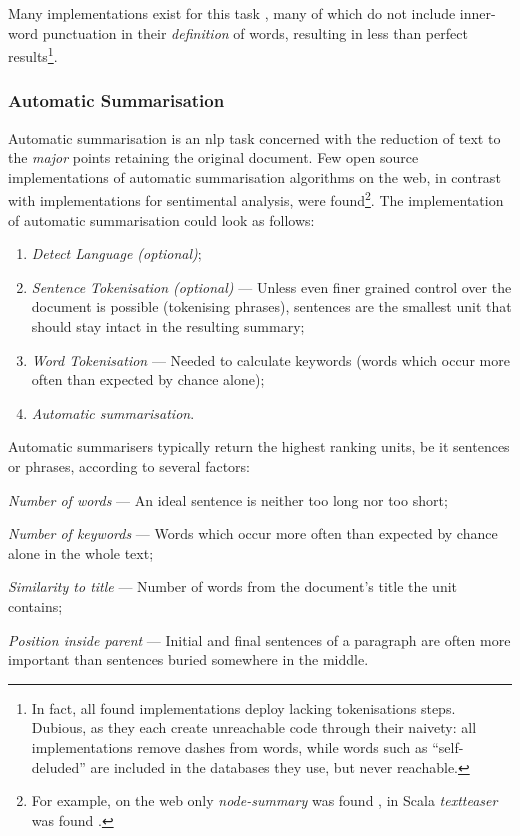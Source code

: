 Many implementations exist for this task
  \autocites{thinkroth/sentimental-source-code}{mileszim/sediment-source-code}
  {thisandagain/sentiment-source-code}, many of which do not include
  inner-word punctuation in their \emph{definition} of words, resulting in
  less than perfect results\footnote{In fact, all found implementations
      deploy lacking tokenisations steps.
    Dubious, as they each create unreachable code through their naivety:
      all implementations remove dashes from words, while words such as
      ``self-deluded'' are included in the databases they use, but never
      reachable.}.

\subsubsection{Automatic Summarisation}\label{automatic-summarisation}

Automatic summarisation is an \gls{nlp} task concerned with the reduction
  of text to the \emph{major} points retaining the original document.
Few open source implementations of automatic summarisation algorithms on
  the web, in contrast with implementations for sentimental analysis, were
  found\footnote{For example, on the web only \emph{node-summary} was found
    \autocite{jbrooksuk/node-summary-source-code}, in Scala \emph{textteaser}
    was found \autocite{MojoJolo/textteaser-source-code}.}.
The implementation of automatic summarisation could look as follows:

\begin{enumerate}
\item\emph{Detect Language (optional)};
\item\emph{Sentence Tokenisation (optional)} --- Unless even finer grained
  control over the document is possible (tokenising phrases), sentences are
  the smallest unit that should stay intact in the resulting summary;
\item\emph{Word Tokenisation} --- Needed to calculate keywords (words
  which occur more often than expected by chance alone);
\item\emph{Automatic summarisation}.
\end{enumerate}

\noindent Automatic summarisers typically return the highest ranking units,
  be it sentences or phrases, according to several factors:

\begin{aenumerate}
\item\emph{Number of words} --- An ideal sentence is neither too long nor
  too short;
\item\emph{Number of keywords} --- Words which occur more often than
  expected by chance alone in the whole text;
\item\emph{Similarity to title} --- Number of words from the document's
  title the unit contains;
\item\emph{Position inside parent} --- Initial and final sentences of a
  paragraph are often more important than sentences buried somewhere in
  the middle.
\end{aenumerate}

